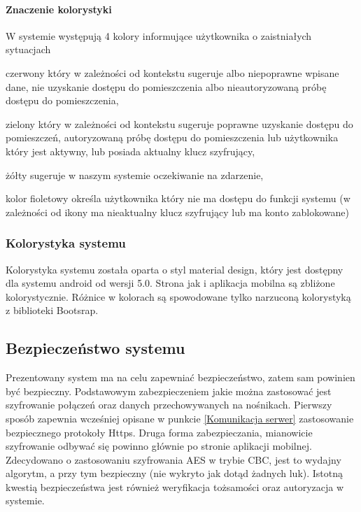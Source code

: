 		\paragraph*{Znaczenie kolorystyki}
		W systemie występują 4 kolory informujące użytkownika o zaistniałych sytuacjach
		\begin{itemize*}
			\item czerwony który w zależności od kontekstu sugeruje albo niepoprawne wpisane dane, nie uzyskanie dostępu do pomieszczenia albo nieautoryzowaną próbę dostępu do pomieszczenia,
			\item zielony który w zależności od kontekstu sugeruje poprawne uzyskanie dostępu do pomieszczeń, autoryzowaną próbę dostępu do pomieszczenia lub użytkownika który jest aktywny, lub posiada aktualny klucz szyfrujący,
			\item żółty sugeruje w naszym systemie oczekiwanie na zdarzenie,
			\item kolor fioletowy określa użytkownika który nie ma dostępu do funkcji systemu (w zależności od ikony ma nieaktualny klucz szyfrujący lub ma konto zablokowane)
		\end{itemize*}
		
	\subsubsection{Kolorystyka systemu}
	Kolorystyka systemu została oparta o styl material design, który jest dostępny dla systemu android od wersji 5.0. Strona jak i aplikacja mobilna są zbliżone kolorystycznie. Różnice w kolorach są spowodowane tylko narzuconą kolorystyką z biblioteki Bootsrap.\cite{And,desingMobile}

	\subsection{Bezpieczeństwo systemu}\label{sec:Projekt bezpieczeństwo}
	Prezentowany system ma na celu zapewniać bezpieczeństwo, zatem sam powinien być bezpieczny. Podstawowym zabezpieczeniem jakie można zastosować jest szyfrowanie połączeń oraz danych przechowywanych na nośnikach. Pierwszy sposób zapewnia wcześniej opisane w punkcie \ref{Komunikacja serwer} zastosowanie bezpiecznego protokoły Https. Druga forma zabezpieczania, mianowicie szyfrowanie odbywać się powinno głównie po stronie aplikacji mobilnej. Zdecydowano o zastosowaniu szyfrowania AES w trybie CBC, jest to wydajny algorytm, a przy tym bezpieczny (nie wykryto jak dotąd żadnych luk). Istotną kwestią bezpieczeństwa jest również weryfikacja tożsamości oraz autoryzacja w systemie.
